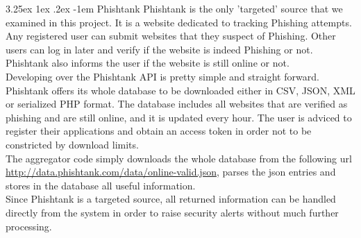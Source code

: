\documentclass[12pt]{article}
\makeatletter
\renewcommand\paragraph{\@startsection{paragraph}{5}{\z@}%
  {3.25ex \@plus1ex \@minus.2ex}%
  {-1em}%
  {\normalfont\normalsize\bfseries}}
\makeatother
\begin{document}
\paragraph{Phishtank}
\hfill \break
Phishtank is the only 'targeted' source that we examined in this project. It is a website dedicated to tracking Phishing attempts. Any registered user can submit websites that they suspect of Phishing. Other users can log in later and verify if the website is indeed Phishing or not. Phishtank also informs the user if the website is still online or not.\\

Developing over the Phishtank API is pretty simple and straight forward. Phishtank offers its whole database to be downloaded either in CSV, JSON, XML or serialized PHP format. The database includes all websites that are verified as phishing and are still online, and it is updated every hour. The user is adviced to register their applications and obtain an access token in order not to be constricted by download limits. \\

The aggregator code simply downloads the whole database from the following url \url{http://data.phishtank.com/data/online-valid.json}, parses the json entries and stores in the database all useful information. \\

Since Phishtank is a targeted source, all returned information can be handled directly from the system in order to raise security alerts without much further processing. 
 
\end{document}
